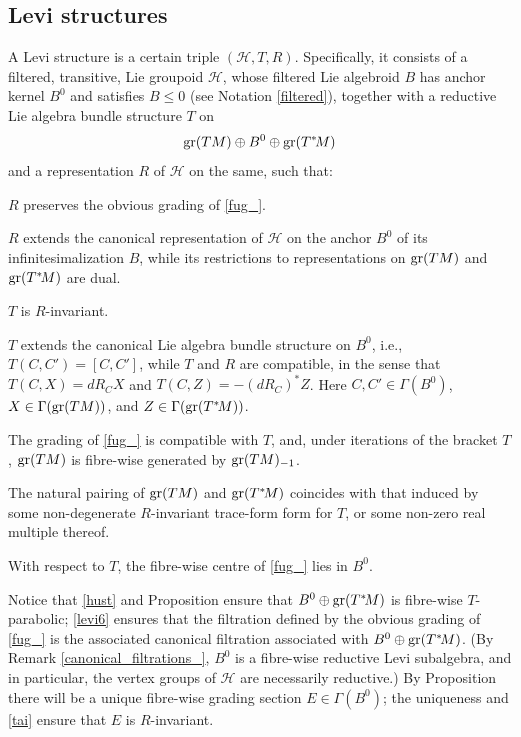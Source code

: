 \documentclass[leqno,12pt]{amsart} %
\begin{document}
\subsection{Levi structures}\label{levi_}
A {\df Levi structure} is a certain triple $({\mathcal H}, T, R)$. Specifically, it
consists of a filtered, transitive, Lie groupoid ${\mathcal H}$, whose filtered Lie
algebroid $B$ has anchor kernel $B^0$ and satisfies $B \le 0$ (see Notation
\ref{filtered}), together with a reductive Lie algebra bundle structure $T$ on
  \begin{equation}
    \operatorname{\operatorname{gr}}(TM) \oplus B^0 \oplus \operatorname{\operatorname{gr}}(T^*\!M)\label{fug_}
  \end{equation}
  and a representation $R$ of ${\mathcal H}$ on the same, such that:
  \begin{conditions}
      \item $R$ preserves the obvious grading of \eqref{fug_}.
      \item $R$ extends the canonical representation of ${\mathcal H} $ on the anchor
        $B^0$ of its infinitesimalization $B$, while its restrictions to representations
        on $\operatorname{\operatorname{gr}}(TM)$ and $\operatorname{\operatorname{gr}}(T^*\!M)$ are dual.
      \item $T$ is $R$-invariant. \label{tai}
      \item\label{levi3_} $T$ extends the canonical Lie algebra bundle structure on $B^0$,
        i.e., $T(C, C') = [C, C']$, while $T $ and $R$ are compatible, in the sense that
        $T(C, X) = dR_C X$ and $T(C, Z) = -(dR_C)^*Z$. Here $C, C' \in \Gamma(B^0)$,
        $X \in \Gamma(\operatorname{\operatorname{gr}}(TM))$, and $Z\in \Gamma(\operatorname{\operatorname{gr}}(T^*\!M))$.

      \item The grading of \eqref{fug_} is compatible with $T$, and, under iterations of
        the bracket $T$, $\operatorname{\operatorname{gr}}(TM)$ is fibre-wise generated by
        $\operatorname{\operatorname{gr}}(TM)_{-1}$.\label{levi6}
      \item The natural pairing of $\operatorname{\operatorname{gr}}(TM)$ and $\operatorname{\operatorname{gr}}(T^*\!M)$ coincides with that
        induced by some non-degenerate $R$-invariant trace-form form for
        $T$, or some non-zero real multiple thereof.\label{killing_duality}
      \item\label{hust} With respect to $T$, the fibre-wise centre of \eqref{fug_} lies in
        $B^0$.
\end{conditions}

Notice that \eqref{hust} and Proposition  ensure that
$B^0 \oplus \operatorname{\operatorname{gr}}(T^*\!M) $ is fibre-wise $T$-parabolic; \eqref{levi6} ensures that the
filtration defined by the obvious grading of \eqref{fug_} is the associated canonical
filtration associated with $B^0 \oplus \operatorname{\operatorname{gr}}(T^*\!M) $. (By Remark
\ref{canonical_filtrations_}, $B^0$ is a fibre-wise reductive Levi subalgebra, and in
particular, the vertex groups of ${\mathcal H} $ are necessarily reductive.)  By
Proposition  there will be a unique fibre-wise
grading section $E \in \Gamma(B^0)$; the uniqueness and \eqref{tai} ensure that $E$ is
$R$-invariant.
\end{document}
